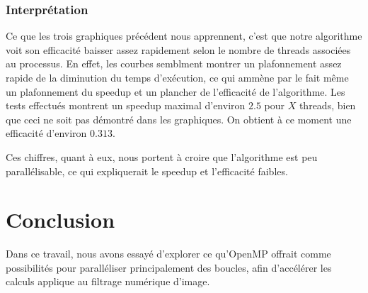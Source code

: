 \documentclass{report}
\begin{document}
\subsection{Interprétation}

Ce que les trois graphiques précédent nous apprennent, c'est que notre algorithme voit son efficacité baisser assez rapidement selon le nombre de threads associées au processus. En effet, les courbes semblment montrer un plafonnement assez rapide de la diminution du temps d'exécution, ce qui ammène par le fait même un plafonnement du speedup et un plancher de l'efficacité de l'algorithme. Les tests effectués montrent un speedup maximal d'environ $2.5$ pour $X$ threads, bien que ceci ne soit pas démontré dans les graphiques. On obtient à ce moment une efficacité d'environ $0.313$. 

\bigskip Ces chiffres, quant à eux, nous portent à croire que l'algorithme est peu parallélisable, ce qui expliquerait le speedup et l'efficacité faibles.

\chapter{Conclusion}
Dans ce travail, nous avons essayé d'explorer ce qu'OpenMP offrait comme possibilités pour
paralléliser principalement des boucles, afin d'accélérer les calculs applique au filtrage
numérique d'image.
\end{document}
